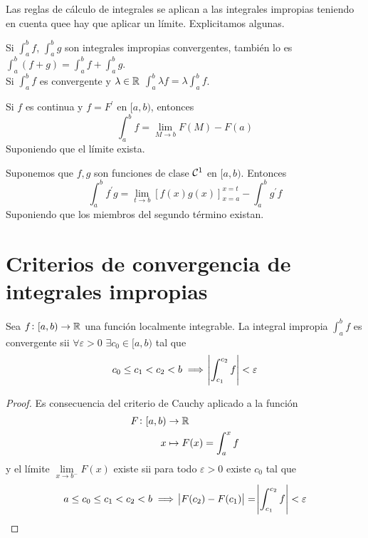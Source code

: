 \begin{obs}
	Las reglas de cálculo de integrales se aplican a las integrales impropias
	teniendo en cuenta quee hay que aplicar un límite. Explicitamos algunas.
\end{obs}

\begin{prop}[Linealidad]
	Si $\int^b_a f$, $\int^b_a g$ son integrales impropias convergentes, tambi\'en
	lo es $\int^b_a (f+g) = \int^b_a f + \int^b_a g$.
	\\
	Si $\int^b_a f$ es convergente y $\lambda \in \mathbb{R}$ $\int^b_a \lambda f =
	\lambda \int^b_a f$.
\end{prop}

\begin{prop}
	Si $f$ es continua y $f = F^\prime$ en $[a,b)$, entonces
	\[
		\int^b_a f = \lim_{M \to b} F(M) - F(a)
	\]
	Suponiendo que el límite exista.
\end{prop}

\begin{prop}%
	Suponemos que $f,g$ son funciones de clase $\mathcal{C}^1$ en $[a,b)$. Entonces
	\[
		\int^b_a f^\prime g = \lim_{t \to b} \left[ f(x)g(x)\right]^{x=t}_{x=a}
		- \int^b_a g^\prime f
	\]
	Suponiendo que los miembros del segundo t\'ermino existan.
\end{prop}



\section{Criterios de convergencia de integrales impropias}

\begin{prop}
	Sea $f \colon [a,b) \to \mathbb{R}$ una función localmente integrable. La integral
	impropia $\int^b_a f$ es convergente sii $\forall \varepsilon > 0$ $\exists c_0
	\in [a,b)$ tal que
	\[
		c_0 \leq c_1 < c_2 < b \implies \abs{\int^{c_2}_{c_1} f} < \varepsilon
	\]
\end{prop}
\begin{proof}
Es consecuencia del criterio de Cauchy aplicado a la función
	\[\begin{aligned}
		F \colon [a,b) &\to \mathbb{R} \\
		x &\mapsto F(x) = \int^x_a f
	\end{aligned}\]
	y el límite $\lim\limits_{x \to b^-}F(x)$ existe sii para todo $\varepsilon >0$
	existe $c_0$ tal que
	\[
		a \leq c_0 \leq c_1 < c_2 < b \implies\abs{F(c_2)-F(c_1)} =
		\abs{\int^{c_2}_{c_1} f} < \varepsilon		
	\]
\end{proof}

